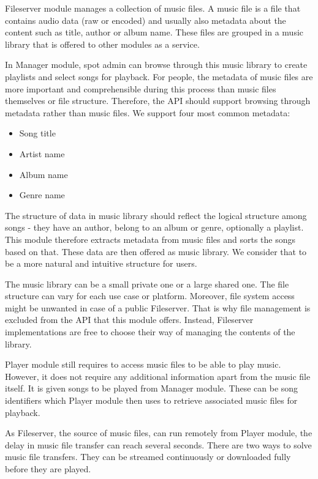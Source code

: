 Fileserver module manages a collection of music files. A music file is a file that contains audio data (raw or encoded) and usually also metadata about the content such as title, author or album name. These files are grouped in a music library that is offered to other modules as a service.
\par
In Manager module, spot admin can browse through this music library to create playlists and select songs for playback. For people, the metadata of music files are more important and comprehensible during this process than music files themselves or file structure. Therefore, the API should support browsing through metadata rather than music files. We support four most common metadata:
\begin{itemize}
    \item Song title
    \item Artist name
    \item Album name
    \item Genre name
\end{itemize}
\par
The structure of data in music library should reflect the logical structure among songs - they have an author, belong to an album or genre, optionally a playlist. This module therefore extracts metadata from music files and sorts the songs based on that. These data are then offered as music library. We consider that to be a more natural and intuitive structure for users.
\par
The music library can be a small private one or a large shared one. The file structure can vary for each use case or platform. Moreover, file system access might be unwanted in case of a public Fileserver. That is why file management is excluded from the API that this module offers. Instead, Fileserver implementations are free to choose their way of managing the contents of the library.
\par
Player module still requires to access music files to be able to play music. However, it does not require any additional information apart from the music file itself. It is given songs to be played from Manager module. These can be song identifiers which Player module then uses to retrieve associated music files for playback.
\par
As Fileserver, the source of music files, can run remotely from Player module, the delay in music file transfer can reach several seconds. There are two ways to solve music file transfers. They can be streamed continuously or downloaded fully before they are played.
